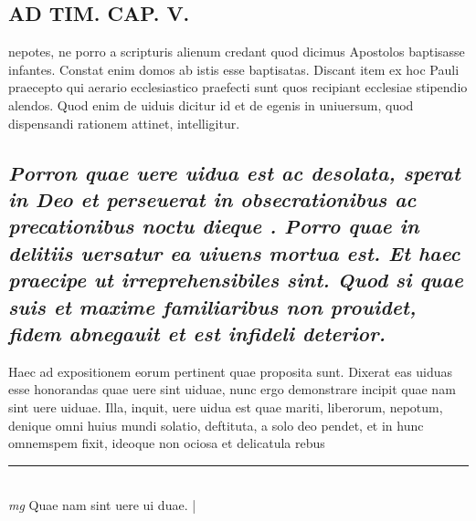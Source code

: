 \documentclass{article}
\begin{document}
\begin{pages}
\section*{AD TIM. CAP. V. }
\marginpar{[ p.150 ]}\pstart nepotes, ne porro a scripturis alienum credant quod dicimus Apostolos baptisasse infantes. Constat enim domos ab istis esse baptisatas. Discant item ex hoc Pauli praecepto qui aerario ecclesiastico praefecti sunt quos recipiant ecclesiae stipendio alendos. Quod enim de uiduis dicitur id et de egenis in uniuersum, quod dispensandi rationem attinet, intelligitur.  \pend
{}
{}
\subsection*{\textit{Porron quae uere uidua est ac desolata, sperat in Deo et perseuerat in obsecrationibus ac precationibus noctu dieque . Porro quae in delitiis uersatur ea uiuens mortua est. Et haec praecipe ut irreprehensibiles sint. Quod si quae suis et maxime familiaribus non prouidet, fidem abnegauit et est infideli deterior. }}\pstart Haec ad expositionem eorum pertinent quae proposita sunt. Dixerat eas uiduas esse honorandas quae uere sint uiduae, nunc ergo demonstrare incipit quae nam sint uere uiduae. Illa, inquit, uere uidua est quae mariti, liberorum, nepotum, denique omni huius mundi solatio, deftituta, a solo deo pendet, et in hunc omnemspem fixit, ideoque non ociosa et delicatula rebus  \pend
\vspace{0.5cm}\noindent
\vspace{0.2cm}\rule{1cm}{0.2pt}\\ 
\hspace{0.2cm}\textit{mg}
\footnotesize Quae nam sint uere ui duae. 
\normalsize| 

\end{pages}
\end{document}
